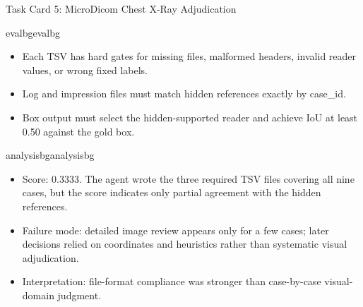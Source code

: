 \begin{ColorTaskCard}{Task Card 5: MicroDicom Chest X-Ray Adjudication \hfill {}}
\begin{minipage}[t]{0.49\linewidth}
\end{minipage}\hfill
\begin{minipage}[t]{0.49\linewidth}
\vspace{0pt}
\begin{CardBlock}{evalbg}{evalbg}
\begin{itemize}
\item Each TSV has hard gates for missing files, malformed headers, invalid reader values, or wrong fixed labels.
\item Log and impression files must match hidden references exactly by case\_id.
\item Box output must select the hidden-supported reader and achieve IoU at least 0.50 against the gold box.
\end{itemize}
\end{CardBlock}

\begin{CardBlock}{analysisbg}{analysisbg}
\begin{itemize}
\item Score: 0.3333. The agent wrote the three required TSV files covering all nine cases, but the score indicates only partial agreement with the hidden references.
\item Failure mode: detailed image review appears only for a few cases; later decisions relied on coordinates and heuristics rather than systematic visual adjudication.
\item Interpretation: file-format compliance was stronger than case-by-case visual-domain judgment.
\end{itemize}
\end{CardBlock}
\end{minipage}
\end{ColorTaskCard}
\clearpage
\endgroup
